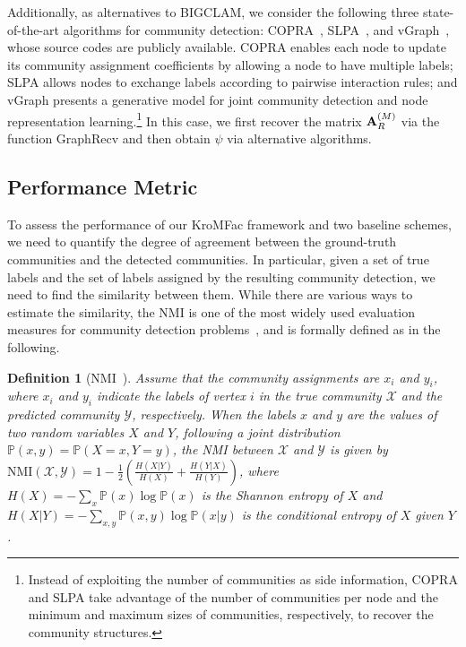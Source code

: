 \documentclass[format=acmsmall, review=false, screen=true]{acmart}
\newtheorem{definition}{Definition}%
\def \log{\operatorname{log}}
\begin{document}
Additionally, as alternatives to BIGCLAM,  we consider the following three state-of-the-art algorithms for community detection:  COPRA~\cite{COPRA}, SLPA~\cite{SLPA}, and vGraph~\cite{vgraph}, whose source codes are publicly available. COPRA enables each node to update its community assignment coefficients by allowing a node to have multiple labels; SLPA allows nodes to exchange labels according to pairwise interaction rules; and vGraph presents a generative model for joint community detection and node representation learning.\footnote{Instead of exploiting the number of communities as side information, COPRA and SLPA take advantage of the number of communities per node and the minimum and maximum sizes of communities, respectively, to recover the community structures.} In this case, we first recover the matrix ${\bf A}^{(M)}_R$ via the function \textsf{GraphRecv} and then obtain $\psi$ via alternative algorithms. 


\subsection{Performance Metric}\label{sec:5b}

To assess the performance of our \textsf{KroMFac} framework and two baseline schemes, we need to quantify the degree of agreement between the ground-truth communities and the detected communities. In particular, given a set of true labels and the set of labels assigned by the resulting community detection, we need to find the similarity between them.
While there are various ways to estimate the similarity, the NMI is one of the most widely used evaluation measures for community detection problems~\cite{bigclam,BNMF}, and is formally defined as in the following.
\begin{definition}[NMI~\cite{nmioverlap}]\label{def:3}
Assume that the community assignments are ${x_i}$ and ${y_i}$, where $x_i$ and $y_i$ indicate the labels of vertex $i$ in the true community $\mathcal{X}$ and the predicted community $\mathcal{Y}$, respectively. When the labels $x$ and $y$ are the values of two random variables $X$ and $Y$, following a joint distribution $\mathbb{P}(x,y) = \mathbb{P}(X = x, Y = y)$, the NMI between $\mathcal{X}$ and $\mathcal{Y}$ is given by
$\text{NMI}(\mathcal{X},\mathcal{Y}) = 1 - \frac{1}{2}\left(\frac{H(X|Y)}{H(X)}+\frac{H(Y|X)}{H(Y)}\right)$,
where $H(X) = -\sum_x \mathbb{P}(x) \log \mathbb{P}(x)$ is the Shannon entropy of $X$ and $H(X|Y) = -\sum_{x,y} \mathbb{P}(x, y) \log \mathbb{P}(x|y)$ is the conditional entropy of $X$ given $Y$. 
\end{definition}
\end{document}
